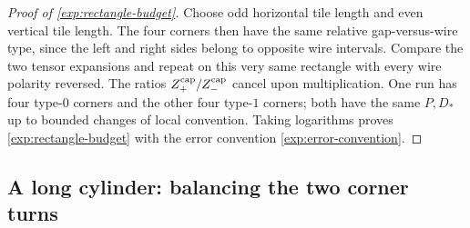 \begin{proof}[Proof of \eqref{exp:rectangle-budget}]
Choose odd horizontal tile length and even vertical tile length. The
four corners then have the same relative gap-versus-wire type, since
the left and right sides belong to opposite wire intervals. Compare the
two tensor expansions and repeat on this very same rectangle with every
wire polarity reversed. The ratios
$Z_+^{\rm cap}/Z_-^{\rm cap}$ cancel upon multiplication. One run has
four type-$0$ corners and the other four type-$1$ corners; both have the
same $P,D_*$ up to bounded changes of local convention. Taking logarithms
proves \eqref{exp:rectangle-budget} with the error convention
\eqref{exp:error-convention}.
\end{proof}

\subsection{A long cylinder: balancing the two corner turns}

